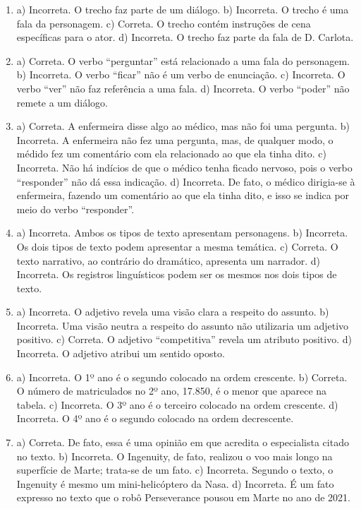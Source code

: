 \begin{enumerate}
\item
a) Incorreta. O trecho faz parte de um diálogo.
b) Incorreta. O trecho é uma fala da personagem.
c) Correta. O trecho contém instruções de cena específicas para o ator.
d) Incorreta. O trecho faz parte da fala de D. Carlota.

\item
a) Correta. O verbo “perguntar” está relacionado a uma fala do personagem.
b) Incorreta. O verbo “ficar” não é um verbo de enunciação.
c) Incorreta. O verbo “ver” não faz referência a uma fala.
d) Incorreta. O verbo “poder” não remete a um diálogo.

\item
a) Correta. A enfermeira disse algo ao médico, mas não foi uma pergunta.
b) Incorreta. A enfermeira não fez uma pergunta, mas, de qualquer modo, o médido fez um comentário com ela relacionado ao que ela tinha dito.
c) Incorreta. Não há indícios de que o médico tenha ficado nervoso, pois o verbo “responder” não dá essa indicação.
d) Incorreta. De fato, o médico dirigia-se à enfermeira, fazendo um comentário ao que ela tinha dito, e isso se indica por meio do verbo “responder”.

\item
a) Incorreta. Ambos os tipos de texto apresentam personagens.
b) Incorreta. Os dois tipos de texto podem apresentar a mesma temática.
c) Correta. O texto narrativo, ao contrário do dramático, apresenta um narrador.
d) Incorreta. Os registros linguísticos podem ser os mesmos nos dois tipos de texto.

\item
a) Incorreta. O adjetivo revela uma visão clara a respeito do assunto.
b) Incorreta. Uma visão neutra a respeito do assunto não utilizaria um adjetivo positivo.
c) Correta. O adjetivo “competitiva” revela um atributo positivo.
d) Incorreta. O adjetivo atribui um sentido oposto.

\item
a) Incorreta. O 1º ano é o segundo colocado na ordem crescente.
b) Correta. O número de matriculados no 2º ano, 17.850, é o menor que aparece na tabela.
c) Incorreta. O 3º ano é o terceiro colocado na ordem crescente.
d) Incorreta. O 4º ano é o segundo colocado na ordem decrescente.

\item
a) Correta. De fato, essa é uma opinião em que acredita o especialista citado no texto.
b) Incorreta. O Ingenuity, de fato, realizou o voo mais longo na superfície de Marte; trata-se de um fato.
c) Incorreta. Segundo o texto, o Ingenuity é mesmo um mini-helicóptero da Nasa.
d) Incorreta. É um fato expresso no texto que o robô Perseverance pousou em Marte no ano de 2021.


\end{enumerate}
